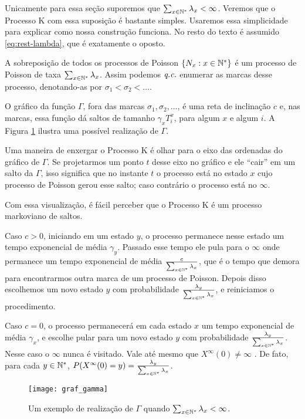 Unicamente para essa seção suporemos que $\sum_{x \in {\mathbb{N^*}}} \lambda_x <
\infty$. Veremos que o Processo K com essa suposição é bastante
simples. Usaremos essa simplicidade para explicar como nossa
construção funciona.  No resto do texto é assumido
\eqref{eq:rest-lambda}, que é exatamente o oposto.

A sobreposição de todos os processos de Poisson $\{N_x : x \in {\mathbb{N^*}}\}$
é um processo de Poisson de taxa $\sum_{x \in {\mathbb{N^*}}}
\lambda_x$. Assim podemos ${\emph{q.c.}}$ enumerar as marcas desse processo,
denotando-as por \mbox{$ \sigma_1 < \sigma_2 < \ldots$}.

O gráfico da função $\Gamma$, fora das marcas $\sigma_1, \sigma_2,
\ldots$, é uma reta de inclinação $c$ e, nas marcas, essa função dá
saltos de tamanho $\gamma_x T^x_i$, para algum $x$ e algum $i$. A
Figura \ref{fig:graf_gamma} ilustra uma possível realização de
$\Gamma$.

Uma maneira de enxergar o Processo K é olhar para o eixo das ordenadas
do gráfico de $\Gamma$. Se projetarmos um ponto $t$ desse eixo no
gráfico e ele ``cair'' em um salto da $\Gamma$, isso significa que no
instante $t$ o processo está no estado $x$ cujo processo de Poisson
gerou esse salto; caso contrário o processo está no $\infty$.

Com essa visualização, é fácil perceber que o Processo K é um processo
markoviano de saltos.

Caso $c > 0$, iniciando em um estado $y$, o processo permanece nesse
estado um tempo exponencial de média $\gamma_y$. Passado esse tempo
ele pula para o $\infty$ onde permanece um tempo exponencial de média
$\frac{c}{\sum_{x \in {\mathbb{N^*}}} \lambda_x}$, que é o tempo que demora para
encontrarmos outra marca de um processo de Poisson. Depois disso
escolhemos um novo estado $y$ com probabilidade
$\frac{\lambda_y}{\sum_{x \in {\mathbb{N^*}}} \lambda_x}$, e reiniciamos o
procedimento.

Caso $c=0$, o processo permanecerá em cada estado $x$ um tempo
exponencial de média $\gamma_x$, e escolhe pular para um novo estado
$y$ com probabilidade $\frac{\lambda_y}{\sum_{x \in {\mathbb{N^*}}} \lambda_x}$.
Nesse caso o $\infty$ nunca é visitado. Vale até mesmo que
$X^\infty(0) \neq \infty$ \qc. De fato, para cada $y \in {\mathbb{N^*}}$, 
$P(X^\infty(0) = y) = \frac{\lambda_y}{\sum_{x \in {\mathbb{N^*}}} \lambda_x}$.

\begin{figure}
  \centering
  \texttt{[image: graf\_gamma]}
  \caption{Um exemplo de realização de $\Gamma$ quando $\sum_{x \in
      {\mathbb{N^*}}} \lambda_x < \infty$.}
  \label{fig:graf_gamma}
\end{figure}


